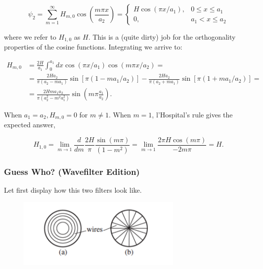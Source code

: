 \begin{equation}
	\psi_{2} = \sum_{m=1}^{\infty} H_{m,0} \cos \left(\frac{m \pi x}{a_{2}}\right)=\left\{\begin{array}{ll}
		H \cos \left(\pi x / a_{1}\right), & 0 \leq x \leq a_{1} \\
		0, & a_{1}<x \leq a_{2}
	\end{array}\right.
\end{equation}

where we refer to $H_{1,0}$ as $H$. This is a (quite dirty) job for the orthogonality properties of the cosine functions. Integrating we arrive to:

\begin{equation}
	\begin{split}
		H_{m,0} &=\frac{2 H}{a_{1}} \int_{0}^{a_{1}} d x \cos \left(\pi x / a_{1}\right) \cos \left(m \pi x / a_{2}\right)= \\
		&=\frac{2 H a_{2}}{\pi\left(a_{2}-m a_{1}\right)} \sin \left[\pi\left(1-m a_{1} / a_{2}\right)\right]-\frac{2 H a_{2}}{\pi\left(a_{2}+m a_{1}\right)} \sin \left[\pi\left(1+m a_{1} / a_{2}\right)\right] =\\
		&=\frac{2 H m a_{1} a_{2}}{\pi\left(a_{2}^{2}-m^{2} a_{1}^{2}\right)} \sin \left(m \pi \frac{a_{1}}{a_{2}}\right).
	\end{split}
\end{equation}

When $a_{1}=a_{2}, H_{m,0}=0$ for $m \neq 1$. When $m=1$, l'Hospital's rule gives the expected answer,

\begin{equation}
	H_{1,0}=\lim _{m \rightarrow 1} \frac{d}{d m} \frac{2 H}{\pi} \frac{\sin (m \pi)}{\left(1-m^{2}\right)}=\lim _{m \rightarrow 1} \frac{2 \pi H \cos (m \pi)}{-2 m \pi}=H.
\end{equation}

\subsubsection{Guess Who? (Wavefilter Edition)}\label{Guess Who? (Wavefilter Edition)}

Let first display how this two filters look like.

\begin{figure}[h!]
	\includegraphics[width=8cm]{figures/2waveguides.png}
	\centering
\end{figure}

